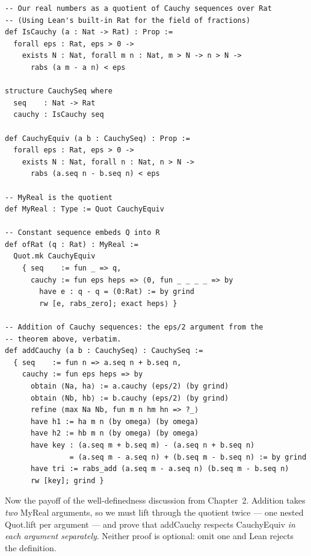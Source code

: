 \documentclass[12pt, openany]{book}
\theoremstyle{plain}
\theoremstyle{definition}
\theoremstyle{remark}
\newcommand{\li}[1]{{\ttfamily\small\color{tealaccent}#1}}
\begin{document}
\begin{leanbox}
\begin{lstlisting}
-- Our real numbers as a quotient of Cauchy sequences over Rat
-- (Using Lean's built-in Rat for the field of fractions)
def IsCauchy (a : Nat -> Rat) : Prop :=
  forall eps : Rat, eps > 0 ->
    exists N : Nat, forall m n : Nat, m > N -> n > N ->
      rabs (a m - a n) < eps

structure CauchySeq where
  seq    : Nat -> Rat
  cauchy : IsCauchy seq

def CauchyEquiv (a b : CauchySeq) : Prop :=
  forall eps : Rat, eps > 0 ->
    exists N : Nat, forall n : Nat, n > N ->
      rabs (a.seq n - b.seq n) < eps

-- MyReal is the quotient
def MyReal : Type := Quot CauchyEquiv

-- Constant sequence embeds Q into R
def ofRat (q : Rat) : MyReal :=
  Quot.mk CauchyEquiv
    { seq    := fun _ => q,
      cauchy := fun eps heps => ⟨0, fun _ _ _ _ => by
        have e : q - q = (0:Rat) := by grind
        rw [e, rabs_zero]; exact heps⟩ }

-- Addition of Cauchy sequences: the eps/2 argument from the
-- theorem above, verbatim.
def addCauchy (a b : CauchySeq) : CauchySeq :=
  { seq    := fun n => a.seq n + b.seq n,
    cauchy := fun eps heps => by
      obtain ⟨Na, ha⟩ := a.cauchy (eps/2) (by grind)
      obtain ⟨Nb, hb⟩ := b.cauchy (eps/2) (by grind)
      refine ⟨max Na Nb, fun m n hm hn => ?_⟩
      have h1 := ha m n (by omega) (by omega)
      have h2 := hb m n (by omega) (by omega)
      have key : (a.seq m + b.seq m) - (a.seq n + b.seq n)
               = (a.seq m - a.seq n) + (b.seq m - b.seq n) := by grind
      have tri := rabs_add (a.seq m - a.seq n) (b.seq m - b.seq n)
      rw [key]; grind }
\end{lstlisting}
\end{leanbox}
\color{black}

Now the payoff of the well-definedness discussion from Chapter~2.  Addition takes \emph{two} \li{MyReal} arguments, so we must lift through the quotient twice --- one nested \li{Quot.lift} per argument --- and prove that \li{addCauchy} respects \li{CauchyEquiv} \emph{in each argument separately}.  Neither proof is optional: omit one and Lean rejects the definition.
\end{document}
